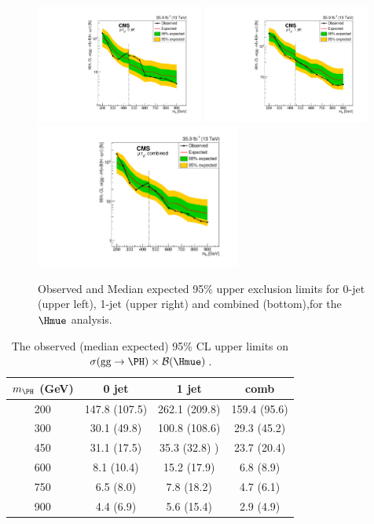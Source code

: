 \begin{figure}[!htpb]\centering
 \includegraphics[width=0.49\textwidth]{plots_and_figures/chapter8/highmass/Figure_004-c.pdf}
 \includegraphics[width=0.49\textwidth]{plots_and_figures/chapter8/highmass/Figure_004-d.pdf} \\
 \includegraphics[width=0.60\textwidth]{plots_and_figures/chapter8/highmass/Figure_005-b.pdf}
\caption{Observed and Median expected 95\% upper exclusion limits for 0-jet (upper left), 1-jet (upper right) and combined (bottom),for the $\Hmue$ analysis. ~\cite{HIG-18-017}}
 \label{fig:limits_Hmue}
\end{figure}



\begin{table}
\caption{The observed (median expected) 95\% CL upper limits on $\sigma(\textrm{gg}\rightarrow \PH) \times\mathcal{B}(\Hmue)$.}
\begin{center}
\begin{tabular}{c|c|c|c}
\hline
$m_{\PH}$ (GeV) & 0 jet & 1 jet  & comb\\
\hline
200 &147.8 (107.5) & 262.1 (209.8)& 159.4 (95.6) \\
300 &30.1 (49.8) & 100.8 (108.6) & 29.3 (45.2) \\
450 &31.1 (17.5) & 35.3 (32.8) )& 23.7 (20.4) \\
600 &8.1 (10.4)& 15.2 (17.9)& 6.8 (8.9) \\
750 &6.5 (8.0)& 7.8 (18.2)& 4.7 (6.1) \\
900 &4.4 (6.9)& 5.6 (15.4)& 2.9 (4.9) \\
\hline
\end{tabular}
\label{table:limits_Hmue}
\end{center}
\end{table}


